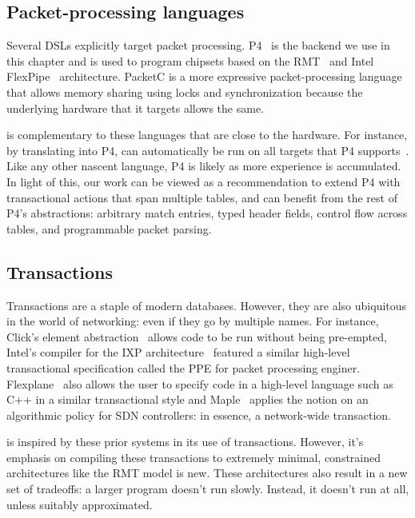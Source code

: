 \subsection{Packet-processing languages}
Several DSLs explicitly target packet processing. P4~\cite{p4} is the backend
we use in this chapter and is used to program chipsets based on the
RMT~\cite{rmt} and Intel FlexPipe~\cite{flexpipe} architecture. PacketC is a
more expressive packet-processing language that allows memory sharing using
locks and synchronization because the underlying hardware that it targets
allows the same.

\pktlanguage{} is complementary to these languages that are close to the
hardware. For instance, by translating into P4, \pktlanguage{} can automatically be
run on all targets that P4 supports~\cite{lavanya_compiler}. Like any other
nascent language, P4 is likely as more experience is accumulated. In light of
this, our work can be viewed as a recommendation to extend P4 with
transactional actions that span multiple tables, and can benefit from the rest
of P4's abstractions: arbitrary match entries, typed header fields, control
flow across tables, and programmable packet parsing.

\subsection{Transactions}
Transactions are a staple of modern databases. However, they are also
ubiquitous in the world of networking: even if they go by multiple names. For
instance, Click's element abstraction~\cite{click} allows code to be run
without being pre-empted, Intel's compiler for the IXP
architecture~\cite{intel} featured a similar high-level transactional
specification called the PPE for packet processing enginer.
Flexplane~\cite{flexplane} also allows the user to specify code in a high-level
language such as C++ in a similar transactional style and Maple~\cite{maple}
applies the notion on an algorithmic policy for SDN controllers: in essence,
a network-wide transaction.

 \pktlanguage{} is inspired by these prior systems in its use of transactions.
However, it's emphasis on compiling these transactions to extremely minimal,
constrained architectures like the RMT model is new. These architectures also
result in a new set of tradeoffs: a larger program doesn't run slowly. Instead,
it doesn't run at all, unless suitably approximated.

